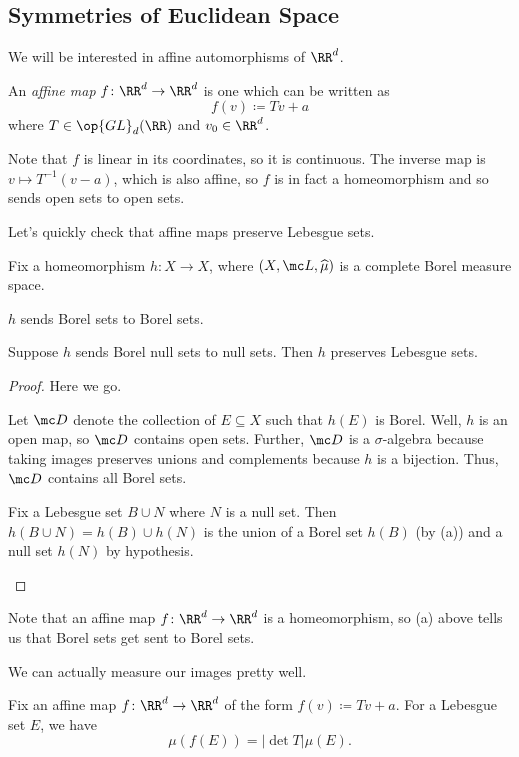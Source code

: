 \documentclass[../notes.tex]{subfiles}
\begin{document}
\subsection{Symmetries of Euclidean Space}
We will be interested in affine automorphisms of $\RR^d$.
\begin{definition}[affine]
	An \textit{affine map} $f\colon\RR^d\to\RR^d$ is one which can be written as
	\[f(v)\coloneqq Tv+a\]
	where $T\in\op{GL}_d(\RR)$ and $v_0\in\RR^d$.
\end{definition}
\begin{remark}
	Note that $f$ is linear in its coordinates, so it is continuous. The inverse map is $v\mapsto T^{-1}(v-a)$, which is also affine, so $f$ is in fact a homeomorphism and so sends open sets to open sets.
\end{remark}
Let's quickly check that affine maps preserve Lebesgue sets.
\begin{lemma} \label{lem:preserve-leb}
	Fix a homeomorphism $h\colon X\to X$, where $(X,\mc L,\widehat\mu)$ is a complete Borel measure space.
	\begin{listalph}
		\item $h$ sends Borel sets to Borel sets.
		\item Suppose $h$ sends Borel null sets to null sets. Then $h$ preserves Lebesgue sets.
	\end{listalph}
\end{lemma}
\begin{proof}
	Here we go.
	\begin{listalph}
		\item Let $\mc D$ denote the collection of $E\subseteq X$ such that $h(E)$ is Borel. Well, $h$ is an open map, so $\mc D$ contains open sets. Further, $\mc D$ is a $\sigma$-algebra because taking images preserves unions and complements because $h$ is a bijection. Thus, $\mc D$ contains all Borel sets.
		\item Fix a Lebesgue set $B\cup N$ where $N$ is a null set. Then $h(B\cup N)=h(B)\cup h(N)$ is the union of a Borel set $h(B)$ (by (a)) and a null set $h(N)$ by hypothesis.
		\qedhere
	\end{listalph}
\end{proof}
\begin{remark}
	Note that an affine map $f\colon\RR^d\to\RR^d$ is a homeomorphism, so (a) above tells us that Borel sets get sent to Borel sets.
\end{remark}
We can actually measure our images pretty well.
\begin{proposition}
	Fix an affine map $f\colon\RR^d\to\RR^d$ of the form $f(v)\coloneqq Tv+a$. For a Lebesgue set $E$, we have
	\[\mu(f(E))=\left|\det T\right|\mu(E).\]
\end{proposition}
\end{document}
